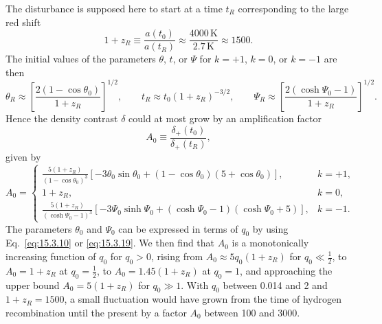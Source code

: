The disturbance is supposed here to start at a time \(t_R\) corresponding to
the large red shift
\[
  1+z_R
  \equiv
  \frac{a(t_0)}{a(t_R)}
  \approx
  \frac{4000\,\mathrm K}{2.7\,\mathrm K}
  \approx1500.
\]
The initial values of the parameters \(\theta\), \(t\), or \(\Psi\) for
\(k=+1\), \(k=0\), or \(k=-1\) are then
\[
  \theta_R
  \approx
  \left[
    \frac{2(1-\cos\theta_0)}{1+z_R}
  \right]^{1/2},
  \qquad
  t_R\approx t_0(1+z_R)^{-3/2},
  \qquad
  \Psi_R
  \approx
  \left[
    \frac{2(\cosh\Psi_0-1)}{1+z_R}
  \right]^{1/2}.
\]
Hence the density contrast \(\delta\) could at most grow by an amplification
factor
\begin{equation}
  A_0
  \equiv
  \frac{\delta_+(t_0)}{\delta_+(t_R)},
  \tag{15.9.33}\label{eq:15.9.33}
\end{equation}
given by
\begin{equation}
  A_0
  =
  \begin{cases}
    \displaystyle
    \frac{5(1+z_R)}{(1-\cos\theta_0)^3}
    \left[
      -3\theta_0\sin\theta_0
      +(1-\cos\theta_0)(5+\cos\theta_0)
    \right],
    &k=+1,\\[1.2em]
    1+z_R,
    &k=0,\\[0.8em]
    \displaystyle
    \frac{5(1+z_R)}{(\cosh\Psi_0-1)^3}
    \left[
      -3\Psi_0\sinh\Psi_0
      +(\cosh\Psi_0-1)(\cosh\Psi_0+5)
    \right],
    &k=-1.
  \end{cases}
  \tag{15.9.34}\label{eq:15.9.34}
\end{equation}
The parameters \(\theta_0\) and \(\Psi_0\) can be expressed in terms of
\(q_0\) by using Eq.~\eqref{eq:15.3.10} or \eqref{eq:15.3.19}. We then
find that \(A_0\) is a monotonically increasing function of \(q_0\) for
\(q_0>0\), rising from \(A_0\approx5q_0(1+z_R)\) for \(q_0\ll\tfrac12\),
to \(A_0=1+z_R\) at \(q_0=\tfrac12\), to
\(A_0=1.45(1+z_R)\) at \(q_0=1\), and approaching the upper bound
\(A_0=5(1+z_R)\) for \(q_0\gg1\). With \(q_0\) between 0.014 and 2 and
\(1+z_R=1500\), a small fluctuation would have grown from the time of
hydrogen recombination until the present by a factor \(A_0\) between 100
and 3000.


